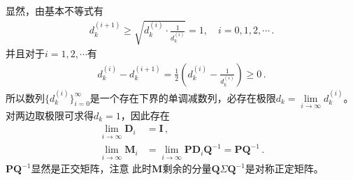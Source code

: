 \begin{prove}
    显然，由基本不等式有
    \begin{align}
        d_k^{(i+1)}\ge\sqrt{d_k^{(i)}\cdot\frac{1}{d_k^{(i)}}}=1,\quad i=0,1,2,\cdots\, .
    \end{align}
    并且对于$i=1,2,\cdots$有
    \begin{align}
        d_k^{(i)}-d_k^{(i+1)}=\frac{1}{2}\left(d_k^{(i)}-\frac{1}{d_k^{(i)}}\right)\ge0\, .
    \end{align}
    所以数列$\{d_k^{(i)}\}_{i=0}^{\infty}$是一个存在下界的单调减数列，必存在极限$d_k=\lim\limits_{i\rightarrow\infty}{d_k^{(i)}}$。
    对两边取极限可求得$d_k=1$，因此存在
    \begin{align}
        \lim\limits_{i\rightarrow\infty}\bm D_i & =\bm I\, ,                                                                  \\
        \lim\limits_{i\rightarrow\infty}\bm M_i & =\lim\limits_{i\rightarrow\infty}\bm P\bm D_i\bm Q^{-1}=\bm P\bm Q^{-1}\, .
    \end{align}
    $\bm P\bm Q^{-1}$显然是正交矩阵，注意
    此时$\bm M$剩余的分量$\bm Q\bm \varSigma\bm Q^{-1}$是对称正定矩阵。
\end{prove}

